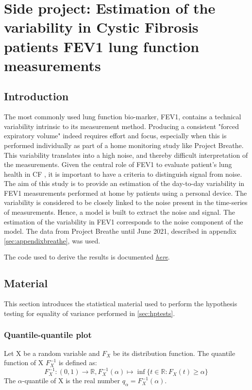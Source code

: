 \chapter{Side project: Estimation of the variability in Cystic Fibrosis patients FEV1 lung function measurements} \label{sec:sideproject}

\section{Introduction}
The most commonly used lung function bio-marker, FEV1, contains a technical variability intrinsic to its measurement method. Producing a consistent "forced expiratory volume" indeed requires effort and focus, especially when this is performed individually as part of a home monitoring study like Project Breathe. This variability translates into a high noise, and thereby difficult interpretation of the measurements. Given the central role of FEV1 to evaluate patient's lung health in CF \cite{giron_2021}, it is important to have a criteria to distinguish signal from noise. The aim of this study is to provide an estimation of the day-to-day variability in FEV1 measurements performed at home by patients using a personal device. The variability is considered to be closely linked to the noise present in the time-series of measurements. Hence, a model is built to extract the noise and signal. The estimation of the variability in FEV1 corresponds to the noise component of the model. The data from Project Breathe until June 2021, described in appendix \ref{sec:appendixbreathe}, was used.

The code used to derive the results is documented \href{https://tristantreb.github.io/pdm/}{\textit{here}}.

\section{Material}
This section introduces the statistical material used to perform the hypothesis testing for equality of variance performed in \ref{sec:hptests}.

\subsection{Quantile-quantile plot}
Let X be a random variable and $F_X$ be its distribution function. The quantile function of X $F_X^{-1}$ is defined as:
\begin{equation}
    F_X^{-1} : (0,1) \longrightarrow \mathbb{R}, F_X^{-1}(\alpha) \longmapsto \inf \{ t \in \mathbb{R}: F_X(t) \geq \alpha \}
\end{equation}
The $\alpha$-quantile of X is the real number $q_\alpha = F_X^{-1}(\alpha)$.


